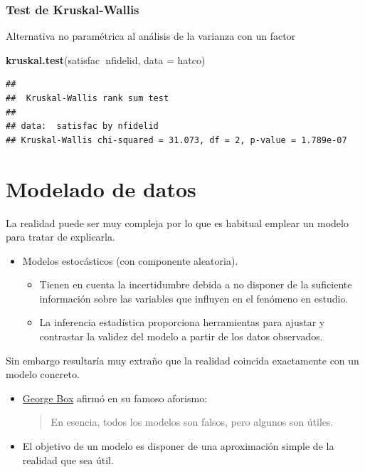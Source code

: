 \documentclass[]{book}
\newenvironment{Shaded}{\begin{snugshade}}{\end{snugshade}}
\newcommand{\KeywordTok}[1]{\textcolor[rgb]{0.13,0.29,0.53}{\textbf{#1}}}
\newcommand{\DataTypeTok}[1]{\textcolor[rgb]{0.13,0.29,0.53}{#1}}
\newcommand{\OperatorTok}[1]{\textcolor[rgb]{0.81,0.36,0.00}{\textbf{#1}}}
\newcommand{\NormalTok}[1]{#1}
\begin{document}
\subsection{Test de Kruskal-Wallis}\label{test-de-kruskal-wallis}

Alternativa no paramétrica al análisis de la varianza con un factor

\begin{Shaded}
\begin{Highlighting}[]
\KeywordTok{kruskal.test}\NormalTok{(satisfac}\OperatorTok{~}\NormalTok{nfidelid, }\DataTypeTok{data =}\NormalTok{ hatco)}
\end{Highlighting}
\end{Shaded}

\begin{verbatim}
## 
##  Kruskal-Wallis rank sum test
## 
## data:  satisfac by nfidelid
## Kruskal-Wallis chi-squared = 31.073, df = 2, p-value = 1.789e-07
\end{verbatim}

\chapter{Modelado de datos}\label{modelado-de-datos}

La realidad puede ser muy compleja por lo que es habitual emplear un
modelo para tratar de explicarla.

\begin{itemize}
\item
  Modelos estocásticos (con componente aleatoria).

  \begin{itemize}
  \item
    Tienen en cuenta la incertidumbre debida a no disponer de la
    suficiente información sobre las variables que influyen en el
    fenómeno en estudio.
  \item
    La inferencia estadística proporciona herramientas para ajustar y
    contrastar la validez del modelo a partir de los datos observados.
  \end{itemize}
\end{itemize}

Sin embargo resultaría muy extraño que la realidad coincida exactamente
con un modelo concreto.

\begin{itemize}
\item
  \href{https://en.wikipedia.org/wiki/George_E._P._Box}{George Box}
  afirmó en su famoso aforismo:

  \begin{quote}
  En esencia, todos los modelos son falsos, pero algunos son útiles.
  \end{quote}
\item
  El objetivo de un modelo es disponer de una aproximación simple de la
  realidad que sea útil.
\end{itemize}
\end{document}
